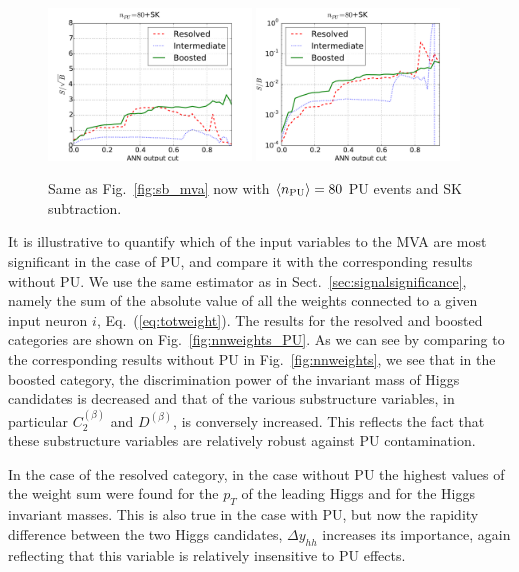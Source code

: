 \begin{figure}[t]
\begin{center}
\includegraphics[width=0.48\textwidth]{plots/ssb_SKPU80.pdf}
\includegraphics[width=0.48\textwidth]{plots/sb_SKPU80.pdf}
\caption{\small Same as Fig.~\ref{fig:sb_mva}
  now
  with  $\left\langle n_{\rm PU}\right\rangle=80$ PU events 
  and SK subtraction.
}
\label{fig:sb_mva_PU}
\end{center}
\end{figure}

It is illustrative to quantify which of the input variables
to the MVA are most significant in the case of PU,
and compare it with the corresponding
results without PU.
%
We use the same estimator as in Sect.~\ref{sec:signalsignificance},
namely the sum
of the absolute value of all the weights connected to a given
input neuron $i$, Eq.~(\ref{eq:totweight}).
%
The results for the resolved and boosted categories are shown
on Fig.~\ref{fig:nnweights_PU}.
%
As we can see by comparing to the corresponding
results without PU in Fig.~\ref{fig:nnweights}, we see that
in the boosted category, the discrimination power of the invariant
mass of Higgs candidates is decreased and that of the various substructure
variables, in particular $C_2^{(\beta)}$ and
$D^{(\beta)}$, is conversely
increased.
%
This reflects the fact that these substructure variables are
relatively robust against PU contamination.

In the case of the resolved category, in the case without PU the highest
values of the weight sum were found for the $p_T$ of the leading
Higgs and for the Higgs invariant masses.
%
This is also true in the case with PU, but now the rapidity difference
between the two Higgs candidates, $\Delta y_{hh}$ increases its
importance, again reflecting that this variable is relatively
insensitive to PU effects.

